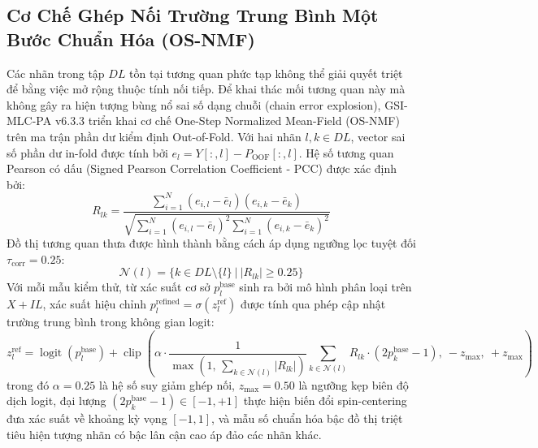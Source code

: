 \documentclass[10pt,a4paper]{article}
\begin{document}
\subsection{Cơ Chế Ghép Nối Trường Trung Bình Một Bước Chuẩn Hóa (OS-NMF)}
Các nhãn trong tập $DL$ tồn tại tương quan phức tạp không thể giải quyết triệt để bằng việc mở rộng thuộc tính nối tiếp. Để khai thác mối tương quan này mà không gây ra hiện tượng bùng nổ sai số dạng chuỗi (chain error explosion), GSI-MLC-PA v6.3.3 triển khai cơ chế One-Step Normalized Mean-Field (OS-NMF) trên ma trận phần dư kiểm định Out-of-Fold. Với hai nhãn $l, k \in DL$, vector sai số phần dư in-fold được tính bởi $e_l = Y[:, l] - P_{\text{OOF}}[:, l]$. Hệ số tương quan Pearson có dấu (Signed Pearson Correlation Coefficient - PCC) được xác định bởi:
\begin{equation}
    R_{lk} = \frac{\sum_{i=1}^N (e_{i, l} - \bar{e}_l)(e_{i, k} - \bar{e}_k)}{\sqrt{\sum_{i=1}^N (e_{i, l} - \bar{e}_l)^2 \sum_{i=1}^N (e_{i, k} - \bar{e}_k)^2}}
\end{equation}
Đồ thị tương quan thưa được hình thành bằng cách áp dụng ngưỡng lọc tuyệt đối $\tau_{\text{corr}} = 0.25$:
\begin{equation}
    \mathcal{N}(l) = \big\{ k \in DL \setminus \{l\} \ \big\vert \ |R_{lk}| \ge 0.25 \big\}
\end{equation}
Với mỗi mẫu kiểm thử, từ xác suất cơ sở $p_l^{\text{base}}$ sinh ra bởi mô hình phân loại trên $X + IL$, xác suất hiệu chỉnh $p_l^{\text{refined}} = \sigma(z_l^{\text{ref}})$ được tính qua phép cập nhật trường trung bình trong không gian logit:
\begin{equation}
    z_l^{\text{ref}} = \operatorname{logit}(p_l^{\text{base}}) + \operatorname{clip}\left(\alpha \cdot \frac{1}{\max\left(1, \, \sum_{k \in \mathcal{N}(l)} |R_{lk}|\right)} \sum_{k \in \mathcal{N}(l)} R_{lk} \cdot (2 p_k^{\text{base}} - 1), \ -z_{\max}, \ +z_{\max}\right)
\end{equation}
trong đó $\alpha = 0.25$ là hệ số suy giảm ghép nối, $z_{\max} = 0.50$ là ngưỡng kẹp biên độ dịch logit, đại lượng $(2p_k^{\text{base}} - 1) \in [-1, +1]$ thực hiện biến đổi spin-centering đưa xác suất về khoảng kỳ vọng $[-1, 1]$, và mẫu số chuẩn hóa bậc đồ thị triệt tiêu hiện tượng nhãn có bậc lân cận cao áp đảo các nhãn khác.
\end{document}
